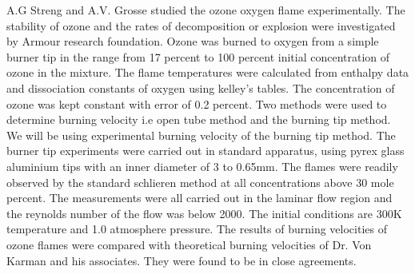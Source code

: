 \bigskip
\noindent A.G Streng and A.V. Grosse \cite{Streng}  studied the ozone oxygen flame experimentally. The stability of ozone and the rates of decomposition or explosion were investigated by Armour research foundation. Ozone was burned to oxygen from a simple burner tip in the range from 17 percent to 100 percent initial concentration of ozone in the mixture. The flame temperatures were calculated from enthalpy data and dissociation constants of oxygen using kelley's tables. The concentration of ozone was kept constant with error of   0.2 percent. Two methods were used to determine burning velocity i.e open tube method and the burning tip method. We will be using experimental burning velocity of the burning tip method. The burner tip experiments were carried out in standard apparatus, using pyrex glass aluminium tips with an inner diameter of 3 to 0.65mm. The flames were readily observed by the standard schlieren method at all concentrations above 30 mole percent. The measurements were all carried out in the laminar flow region and the reynolds number of the flow was below 2000. The initial conditions are 300K temperature and 1.0 atmosphere pressure. The results of burning velocities of ozone flames were compared with theoretical burning velocities of Dr. Von Karman and his associates. They were found to be in close agreements. 
